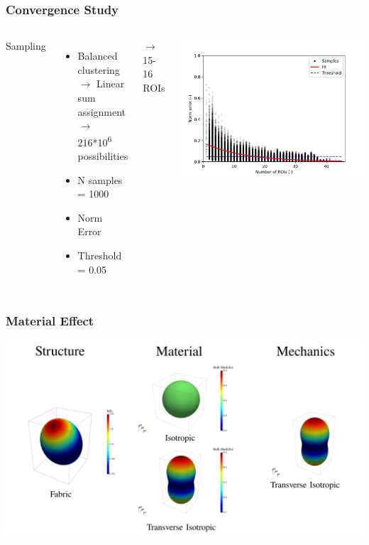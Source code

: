 \documentclass[xcolor=table,11pt]{beamer}
\begin{document}
	\begin{frame}
		\frametitle{Convergence Study}

		\begin{columns}
			\vfill

			Sampling
			\begin{itemize}
				\item Balanced clustering\\
					  $\rightarrow$ Linear sum assignment\\
					  $\rightarrow$ 216*10\textsuperscript{6} possibilities
				\item N samples = 1000
				\item Norm Error
				\item Threshold = 0.05
			\end{itemize}
			$\rightarrow$ 15-16 ROIs
			\vfill

			\vfill
			\includegraphics[width=\linewidth, trim=75 0 0 0]{03_ConvergenceStudy/Results/NormError}\\
			\vfill

		\end{columns}

	\end{frame}

	\begin{frame}
		\frametitle{Material Effect}
		\vfill
		\includegraphics[width=\linewidth]{04_MaterialEffect/Material}\\
		\vfill
	\end{frame}
\end{document}
